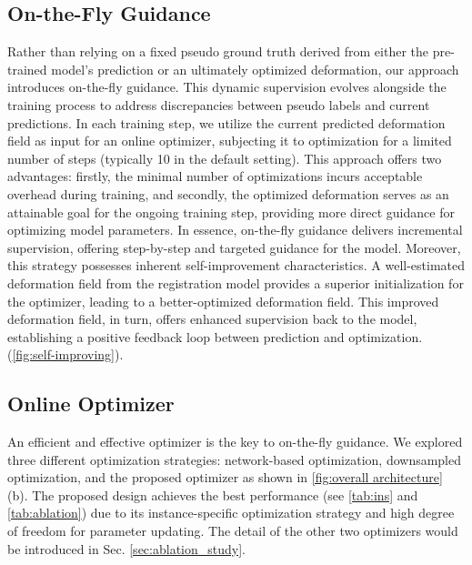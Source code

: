 \documentclass[10pt,twocolumn,letterpaper]{article}
\begin{document}
\subsection{On-the-Fly Guidance}\label{method:Tra}
Rather than relying on a fixed pseudo ground truth derived from either the pre-trained model's prediction or an ultimately optimized deformation, our approach introduces on-the-fly guidance. This dynamic supervision evolves alongside the training process to address discrepancies between pseudo labels and current predictions. In each training step, we utilize the current predicted deformation field as input for an online optimizer, subjecting it to optimization for a limited number of steps (typically 10 in the default setting). This approach offers two advantages: firstly, the minimal number of optimizations incurs acceptable overhead during training, and secondly, the optimized deformation serves as an attainable goal for the ongoing training step, providing more direct guidance for optimizing model parameters. In essence, on-the-fly guidance delivers incremental supervision, offering step-by-step and targeted guidance for the model. Moreover, this strategy possesses inherent self-improvement characteristics. A well-estimated deformation field from the registration model provides a superior initialization for the optimizer, leading to a better-optimized deformation field. This improved deformation field, in turn, offers enhanced supervision back to the model, establishing a positive feedback loop between prediction and optimization. (\cref{fig:self-improving}).

\subsection{Online Optimizer}\label{method:Opt}
An efficient and effective optimizer is the key to on-the-fly guidance. We explored three different optimization strategies: network-based optimization, downsampled optimization, and the proposed optimizer as shown in \cref{fig:overall architecture} (b). The proposed design achieves the best performance (see \cref{tab:ins} and \cref{tab:ablation}) due to its instance-specific optimization strategy and high degree of freedom for parameter updating. The detail of the other two optimizers would be introduced in Sec. \ref{sec:ablation_study}. 
\end{document}

